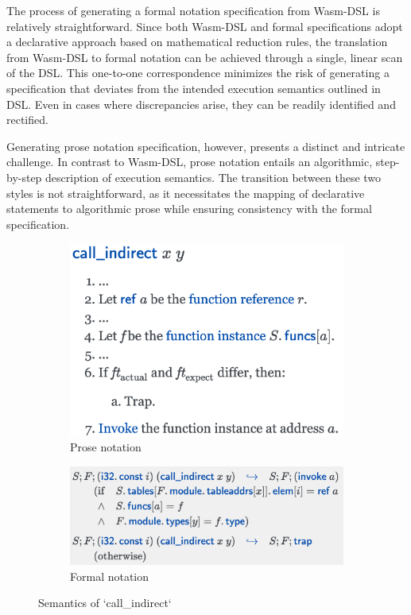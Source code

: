 The process of generating a formal notation specification from Wasm-DSL is
relatively straightforward. Since both Wasm-DSL and formal specifications adopt
a declarative approach based on mathematical reduction rules, the translation
from Wasm-DSL to formal notation can be achieved through a single, linear scan
of the DSL. This one-to-one correspondence minimizes the risk of generating a
specification that deviates from the intended execution semantics outlined in
DSL. Even in cases where discrepancies arise, they can be readily identified
and rectified.

Generating prose notation specification, however, presents a distinct and
intricate challenge. In contrast to Wasm-DSL, prose notation entails an
algorithmic, step-by-step description of execution semantics. The transition
between these two styles is not straightforward, as it necessitates the mapping
of declarative statements to algorithmic prose while ensuring consistency with
the formal specification.

\begin{figure}
  \centering
  \begin{subfigure}[b]{0.45\textwidth}
    \includegraphics[width=\textwidth]{img/prosespec2}
    \caption{Prose notation}
    \label{fig:prosespec2}
  \end{subfigure}
  \hfill
  \begin{subfigure}[b]{0.45\textwidth}
    \includegraphics[width=\textwidth]{img/formalspec2}
    \caption{Formal notation}
    \label{fig:formalspec2}
  \end{subfigure}

  \caption{Semantics of `call\_indirect`}
  \label{fig:spec2}
\end{figure}

